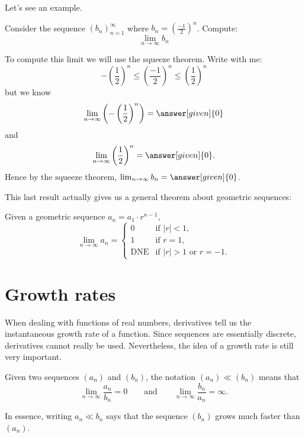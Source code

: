 \documentclass{ximera}
\begin{document}
Let's see an example.

\begin{example}
  Consider the sequence $(b_n)_{n=1}^{\infty}$ where $b_n =
  \left(\frac{-1}{2}\right)^n$. Compute:
  \[
  \lim_{n\to\infty}b_n
  \]
  \begin{explanation}
    To compute this limit we will use the squeeze theorem. Write with
    me:
    \[
    -\left(\frac{1}{2}\right)^n\le \left(\frac{-1}{2}\right)^n \le \left(\frac{1}{2}\right)^n
    \]
    but we know
    \[
    \lim_{n\to \infty}\left(-\left(\frac{1}{2}\right)^n\right) = \answer[given]{0}
    \]
    and
    \[
    \lim_{n\to \infty}\left(\frac{1}{2}\right)^n =\answer[given]{0}.
    \]
    Hence by the squeeze theorem, $\lim_{n\to\infty} b_n = \answer[given]{0}$.
  \end{explanation}
\end{example}


This last result actually gives us a general theorem about geometric
sequences:

\begin{theorem}
  Given a geometric sequence $a_n = a_1 \cdot r^{n-1}$,
  \[
  \lim_{n\to\infty} a_n =
  \begin{cases}
    0 &\text{if $|r|<1$,}\\
    1 &\text{if $r=1$,}\\
    \text{DNE} &\text{if $|r|>1$ or $r=-1$.}
  \end{cases}
  \]
\end{theorem}


\section{Growth rates}

When dealing with functions of real numbers, derivatives tell us the
instantaneous growth rate of a function. Since sequences are essentially
discrete, derivatives cannot really be used. Nevertheless, the idea of
a growth rate is still very important.

\begin{definition}
  Given two sequences $(a_n)$ and $(b_n)$, the notation $(a_n) \ll
  (b_n)$ means that
  \[
  \lim_{n\to\infty} \frac{a_n}{b_n} =
  0\qquad\text{and}\qquad\lim_{n\to\infty} \frac{b_n}{a_n} =\infty.
  \]
\end{definition}

In essence, writing $a_n \ll b_n$ says that the sequence $(b_n)$ grows
much faster than $(a_n)$.
\end{document}
